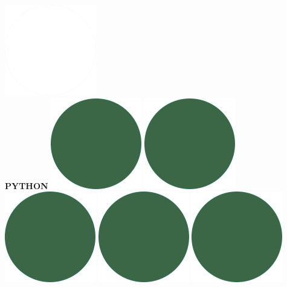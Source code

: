 \documentclass[a4paper]{friggeri-cv_reccius-experiment}
\begin{document}
\begin{aside}
    \includegraphics[scale=0.11]{img/WhiteDots.png}\\
    \belowspace
    \textbf{PYTHON}\hfill
    \includegraphics[scale=0.11]{img/IPSGreenDots.png}
    \includegraphics[scale=0.11]{img/IPSGreenDots.png}
    \includegraphics[scale=0.11]{img/IPSGreenDots.png}
    \includegraphics[scale=0.11]{img/IPSGreenDots.png}
    \includegraphics[scale=0.11]{img/IPSGreenDots.png}

\end{aside}
\end{document}
